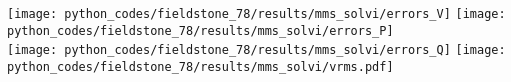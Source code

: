 \begin{center}
\texttt{[image: python\_codes/fieldstone\_78/results/mms\_solvi/errors\_V]}
\texttt{[image: python\_codes/fieldstone\_78/results/mms\_solvi/errors\_P]}\\
\texttt{[image: python\_codes/fieldstone\_78/results/mms\_solvi/errors\_Q]}
\texttt{[image: python\_codes/fieldstone\_78/results/mms\_solvi/vrms.pdf]}
\end{center}














